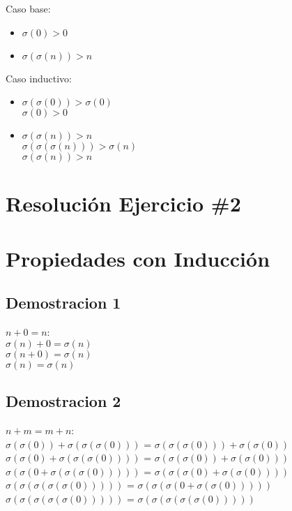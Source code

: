 \documentclass[10pt,a4paper]{article}
\begin{document}
        Caso base: 
        \begin{itemize}
        \item$\sigma(0) > 0$
        \item$\sigma(\sigma(n))>n$
        \end{itemize}
        Caso inductivo:
        \begin{itemize}
        \item$\sigma(\sigma(0)) > \sigma(0)$\\
        $\sigma(0) > 0$\\
        \item$\sigma(\sigma(n)) > n$\\
        $\sigma(\sigma(\sigma(n))) > \sigma(n)$\\
        $\sigma(\sigma(n))>n$
        \end{itemize}
        
        \begin{center}
        \section*{Resoluci\'on Ejercicio \#2}
        \section*{Propiedades con Inducci\'on}
        \end{center}
        
        \subsection{Demostracion 1}
        \begin{center}
        $n+0=n$:\\
        $\sigma(n) + 0 = \sigma(n)$\\
        $\sigma (n + 0) = \sigma(n)$\\
        $\sigma(n) = \sigma(n)$
        \end{center}
        \subsection{Demostracion 2}
        \begin{center}
        $n+m = m+n$:\\
        $\sigma(\sigma(0)) + \sigma(\sigma(\sigma(0)))$ = $\sigma(\sigma(\sigma(0))) + \sigma(\sigma(0))$\\
        $\sigma(\sigma(0) + \sigma(\sigma(\sigma(0))))$ = $\sigma(\sigma(\sigma(0)) + \sigma(\sigma(0)))$\\
        $\sigma(\sigma(0 + \sigma(\sigma(\sigma(0)))))$ = $\sigma(\sigma(\sigma(0) + \sigma(\sigma(0))))$\\
        $\sigma(\sigma(\sigma(\sigma(\sigma(0)))))$ = $\sigma(\sigma(\sigma(0 + \sigma(\sigma(0)))))$\\
        $\sigma(\sigma(\sigma(\sigma(\sigma(0)))))$ = $\sigma(\sigma(\sigma(\sigma(\sigma(0)))))$
        \end{center}
\end{document}
